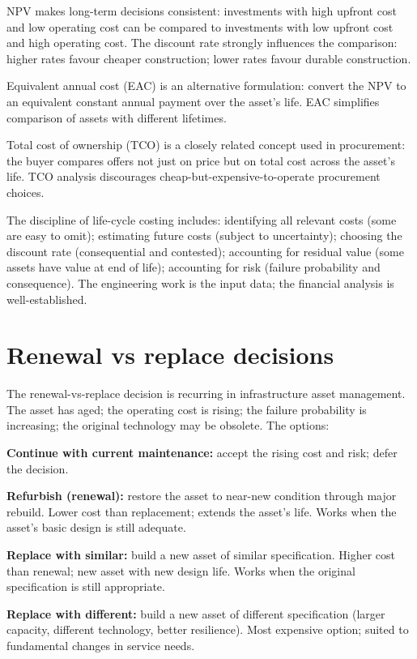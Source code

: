 NPV makes long-term decisions consistent: investments with high upfront cost and low operating cost can be compared to investments with low upfront cost and high operating cost. The discount rate strongly influences the comparison: higher rates favour cheaper construction; lower rates favour durable construction.

Equivalent annual cost (EAC) is an alternative formulation: convert the NPV to an equivalent constant annual payment over the asset's life. EAC simplifies comparison of assets with different lifetimes.

Total cost of ownership (TCO) is a closely related concept used in procurement: the buyer compares offers not just on price but on total cost across the asset's life. TCO analysis discourages cheap-but-expensive-to-operate procurement choices.

The discipline of life-cycle costing includes: identifying all relevant costs (some are easy to omit); estimating future costs (subject to uncertainty); choosing the discount rate (consequential and contested); accounting for residual value (some assets have value at end of life); accounting for risk (failure probability and consequence). The engineering work is the input data; the financial analysis is well-established.

\section{Renewal vs replace decisions}

The renewal-vs-replace decision is recurring in infrastructure asset management. The asset has aged; the operating cost is rising; the failure probability is increasing; the original technology may be obsolete. The options:

\textbf{Continue with current maintenance:} accept the rising cost and risk; defer the decision.

\textbf{Refurbish (renewal):} restore the asset to near-new condition through major rebuild. Lower cost than replacement; extends the asset's life. Works when the asset's basic design is still adequate.

\textbf{Replace with similar:} build a new asset of similar specification. Higher cost than renewal; new asset with new design life. Works when the original specification is still appropriate.

\textbf{Replace with different:} build a new asset of different specification (larger capacity, different technology, better resilience). Most expensive option; suited to fundamental changes in service needs.

